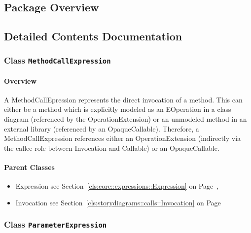 \subsection{Package Overview}
	
			
		



\subsection{Detailed Contents Documentation}
\subsubsection{\Large{Class \bfseries \texttt{MethodCallExpression}\normalfont}}
\label{cls:storydiagrams::calls::expressions::MethodCallExpression} 
\paragraph{Overview}

	
			
A MethodCallEpression represents the direct invocation of a method. This can either be a method which is explicitly modeled as an EOperation in a class diagram (referenced by the OperationExtension) or an unmodeled method in an external library (referenced by an OpaqueCallable). Therefore, a MethodCallExpression references either an OperationExtension (indirectly via the callee role between Invocation and Callable) or an OpaqueCallable.	
		
	



\paragraph{Parent Classes}
\begin{itemize}
\item Expression see Section~\ref{cls:core::expressions::Expression} on Page~\pageref{cls:core::expressions::Expression}, \item Invocation see Section~\ref{cls:storydiagrams::calls::Invocation} on Page~\pageref{cls:storydiagrams::calls::Invocation}\end{itemize}
\subsubsection{\Large{Class \bfseries \texttt{ParameterExpression}\normalfont}}
\label{cls:storydiagrams::calls::expressions::ParameterExpression} 
